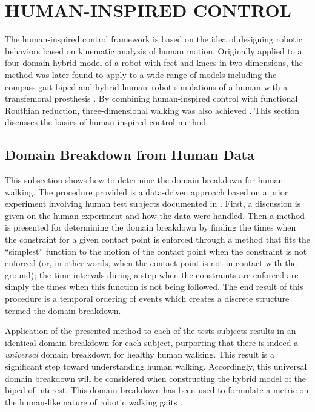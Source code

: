 \chapter{\uppercase{Human-Inspired Control}} \label{ch:hic}

The human-inspired control framework is based on the idea of designing robotic
behaviors based on kinematic analysis of human motion.
%
Originally applied to a four-domain hybrid model of a robot with feet and knees
\cite{Sinnet2011b} in two dimensions, the method was later found to apply to a
wide range of models including the compass-gait biped \cite{Sinnet2011a} and
hybrid human--robot simulations of a human with a transfemoral prosthesis
\cite{Sinnet2011}.
%
By combining human-inspired control with functional Routhian reduction,
three-dimensional walking was also achieved \cite{Sinnet2012a, Sinnet2012}.
%
This section discusses the basics of human-inspired control method.

\section{Domain Breakdown from Human Data} \label{sec:domainbreakdown}

This subsection shows how to determine the domain breakdown for human walking.
%
The procedure provided is a data-driven approach based on a prior experiment
involving human test subjects documented in \cite{Ames2011a}.
%
First, a discussion is given on the human experiment and how the data were
handled. 
%
Then a method is presented for determining the domain breakdown by finding the
times when the constraint for a given contact point is enforced through a method
that fits the ``simplest'' function to the motion of the contact point when the
constraint is not enforced (or, in other words, when the contact point is not in
contact with the ground);
%
the time intervals during a step when the constraints are enforced are simply
the times when this function is not being followed.
%
The end result of this procedure is a temporal ordering of events which creates
a discrete structure termed the domain breakdown.

Application of the presented method to each of the tests subjects results in an
identical domain breakdown for each subject, purporting that there is indeed a
{\em universal} domain breakdown for healthy human walking.
%
This result is a significant step toward understanding human walking.
%
Accordingly, this universal domain breakdown will be considered when
constructing the hybrid model of the biped of interest.
%
This domain breakdown has been used to formulate a metric on the human-like
nature of robotic walking gaits \cite{Ames2011, Vasudevan2013}.

